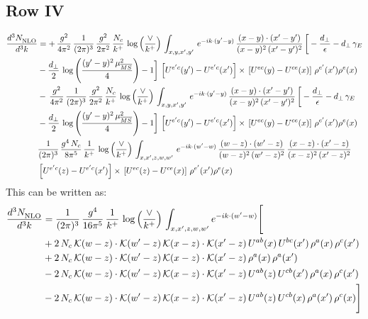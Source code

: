 \documentclass[9pt]{article}
\numberwithin{equation}{section}
\begin{document}
\subsection{Row IV}
\begin{align}
    \frac{d^{3}N_{\rm NLO}^{\rm}}{d^{3}k}  & =    +\, \frac{g^{2}}{4\pi^{2}}\, \frac{1}{(2\pi)^{3}}\,\frac{g^{2}}{2\pi^{2}}\, \frac{N_{c}}{k^{+}}\,\log{\left(\frac{\vee}{k^{+}}\right)}\,\int_{x,y,x',y'}\,e^{-ik\cdot (y'-y)}\,\frac{(x-y)\cdot (x'-y')}{(x-y)^{2}\,(x'-y')^{2}}\,\bigg[-\frac{d_{\perp}}{\epsilon}-d_{\perp}\,\gamma_{E}\notag \\ & -\frac{d_{\perp}}{2}\,\log{\left(\frac{(y'-y)^{2}\,\mu^{2}_{\overline{MS}}}{4}\right)}-1\bigg]\,\left[U^{e'c}(y') - U^{e'c}(x')\right] \times\, \left[U^{ec}(y) - U^{ce}(x)\right]\, \rho^{e'}(x') \rho^{e}(x) \notag \\
&   -\, \frac{g^{2}}{4\pi^{2}}\, \frac{1}{(2\pi)^{3}}\,\frac{g^{2}}{2\pi^{2}}\, \frac{N_{c}}{k^{+}}\,\log{\left(\frac{\vee}{k^{+}}\right)}\,\int_{x,y,x',y'}\,e^{-ik\cdot (y'-y)}\,\frac{(x-y)\cdot (x'-y')}{(x-y)^{2}\,(x'-y')^{2}}\,\bigg[-\frac{d_{\perp}}{\epsilon}-d_{\perp}\,\gamma_{E}\notag \\ &   -\frac{d_{\perp}}{2}\,\log{\left(\frac{(y'-y)^{2}\,\mu^{2}_{\overline{MS}}}{4}\right)}-1\bigg]\,\left[U^{e'c}(y') - U^{e'c}(x')\right] \times\, \left[U^{ec}(y) - U^{ce}(x)\right]\, \rho^{e'}(x') \rho^{e}(x) \notag \\
&   \frac{1}{(2\pi)^{3}}\,\frac{g^{4}\,N_{c}}{8\pi^{5}}\,\frac{1}{k^{+}}\,\log{\left(\frac{\vee}{k^{+}}\right)}\,\int_{x,x',z,w,w'}\,e^{-ik\cdot (w'-w)}\,\frac{(w-z)\cdot(w'-z)}{(w-z)^{2}\,(w'-z)^{2}}\,\frac{(x-z)\cdot(x'-z)}{(x-z)^{2}\,(x'-z)^{2}}\notag \\ &   \left[U^{e'c}(z) - U^{e'c}(x')\right] \times\, \left[U^{ec}(z) - U^{ce}(x)\right]\, \rho^{e'}(x') \rho^{e}(x)
\end{align}
This can be written as: 
\begin{align}
    \frac{d^{3}N_{\rm NLO}^{\rm}}{d^{3}k}  & = \frac{1}{(2\pi)^{3}}\,\frac{g^{4}}{16\pi^{5}}\,\frac{1}{k^{+}}\,\log{\left(\frac{\vee}{k^{+}}\right)}\, \int_{x,x',z,w,w'}e^{-ik\cdot(w'-w)}\Bigg[\notag\\ & +2\,N_{c}\,\mathcal{K}(w-z)\cdot\mathcal{K}(w'-z)\,\mathcal{K}(x-z)\cdot\mathcal{K}(x'-z)\,U^{ab}(x)\,U^{bc}(x')\,\rho^{a}(x)\,\rho^{c}(x')\notag \\ 
&+2\,N_{c}\,\mathcal{K}(w-z)\cdot\mathcal{K}(w'-z)\,\mathcal{K}(x-z)\cdot\mathcal{K}(x'-z)\,\rho^{a}(x)\,\rho^{a}(x')\notag \\ 
&-2\,N_{c}\,\mathcal{K}(w-z)\cdot\mathcal{K}(w'-z)\,\mathcal{K}(x-z)\cdot\mathcal{K}(x'-z)\,U^{ab}(z)\,U^{cb}(x')\,\rho^{a}(x)\,\rho^{c}(x')\notag \\ 
&-2\,N_{c}\,\mathcal{K}(w-z)\cdot\mathcal{K}(w'-z)\,\mathcal{K}(x-z)\cdot\mathcal{K}(x'-z)\,U^{ab}(z)\,U^{cb}(x)\,\rho^{a}(x')\,\rho^{c}(x)\Bigg]
\end{align}
\end{document}
